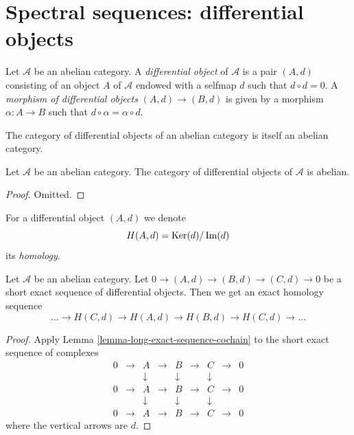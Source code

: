 \section{Spectral sequences: differential objects}
\label{section-differential-object}

\begin{definition}
\label{definition-differential-object}
Let $\mathcal{A}$ be an abelian category.
A {\it differential object} of $\mathcal{A}$
is a pair $(A, d)$ consisting of an
object $A$ of $\mathcal{A}$
endowed with a selfmap $d$ such that $d \circ d = 0$.
A {\it morphism of differential objects} $(A, d) \to (B, d)$
is given by a morphism $\alpha : A \to B$ such that
$d \circ \alpha = \alpha \circ d$.
\end{definition}

\begin{lemma}
\label{lemma-differential-objects-abelian}
\begin{slogan}
The category of differential objects of an abelian category is itself
an abelian category.
\end{slogan}
Let $\mathcal{A}$ be an abelian category.
The category of differential objects of $\mathcal{A}$ is abelian.
\end{lemma}

\begin{proof}
Omitted.
\end{proof}

\begin{definition}
\label{definition-differential-object-homology}
For a differential object $(A, d)$ we denote
$$
H(A, d) = \mathop{\mathrm{Ker}}(d)/\mathop{\mathrm{Im}}(d)
$$
its {\it homology}.
\end{definition}

\begin{lemma}
\label{lemma-differential-objects-ses}
Let $\mathcal{A}$ be an abelian category.
Let $0 \to (A, d) \to (B, d) \to (C, d) \to 0$ be a short exact sequence
of differential objects. Then we get an exact homology sequence
$$
\ldots \to H(C, d) \to H(A, d) \to H(B, d) \to H(C, d) \to \ldots
$$
\end{lemma}

\begin{proof}
Apply Lemma \ref{lemma-long-exact-sequence-cochain}
to the short exact sequence of complexes
$$
\begin{matrix}
0 & \to & A & \to & B & \to & C & \to & 0 \\
& & \downarrow & & \downarrow & & \downarrow \\
0 & \to & A & \to & B & \to & C & \to & 0 \\
& & \downarrow & & \downarrow & & \downarrow \\
0 & \to & A & \to & B & \to & C & \to & 0
\end{matrix}
$$
where the vertical arrows are $d$.
\end{proof}

